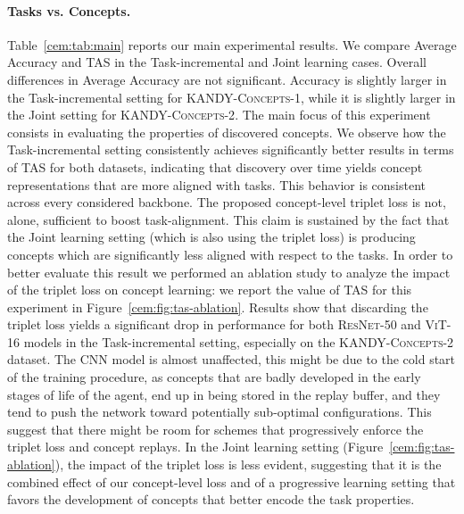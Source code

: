 \paragraph{Tasks vs. Concepts.} Table~\ref{cem:tab:main} reports our main experimental results. We compare {\small\sc Average Accuracy} and {\small\sc TAS} in the Task-incremental and Joint learning cases. 
Overall differences in {\small\sc Average Accuracy} are not significant. Accuracy is slightly larger in the Task-incremental setting for \textsc{KANDY-Concepts-1}, while it is slightly larger in the Joint setting for \textsc{KANDY-Concepts-2}. 
%
The main focus of this experiment consists in evaluating the properties of discovered concepts. We observe how the Task-incremental setting consistently achieves significantly better results in terms of {\small\sc TAS} for both datasets, indicating that discovery over time yields concept representations that are more aligned with tasks. This behavior is consistent across every considered backbone.
The proposed concept-level triplet loss is not, alone, sufficient to boost task-alignment. This claim is sustained by the fact that the Joint learning setting (which is also using the triplet loss) is producing concepts which are significantly less aligned with respect to the tasks.
In order to better evaluate this result we performed an ablation study to analyze the impact of the triplet loss on concept learning: we report the value of {\small\sc TAS} for this experiment in Figure~\ref{cem:fig:tas-ablation}. Results show that discarding the triplet loss yields a significant drop in performance for both \textsc{ResNet-50} and \textsc{ViT-16} models in the Task-incremental setting, especially on the \textsc{KANDY-Concepts-2} dataset. The \textsc{CNN} model is almost unaffected, this might be due to the cold start of the training procedure, as concepts that are badly developed in the early stages of life of the agent, end up in being stored in the replay buffer, and they tend to push the network toward potentially sub-optimal configurations. This suggest that there might be room for schemes that progressively enforce the triplet loss and concept replays. In the Joint learning setting (Figure~\ref{cem:fig:tas-ablation}), the impact of the triplet loss is less evident, suggesting that it is the combined effect of our concept-level loss and of a progressive learning setting that favors the development of concepts that better encode the task properties.


